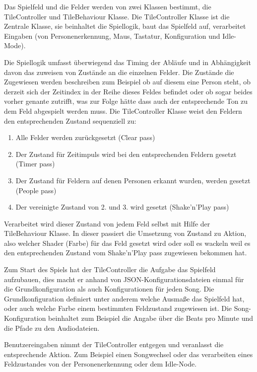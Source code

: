 
Das Spielfeld und die Felder werden von zwei Klassen bestimmt, die TileController und TileBehaviour Klasse. 
Die TileController Klasse ist die Zentrale Klasse, sie beinhaltet die Spiellogik, baut das Spielfeld auf, verarbeitet Eingaben (von Personenerkennung, Maus, Tastatur, Konfiguration und Idle-Mode).

Die Spiellogik umfasst überwiegend das Timing der Abläufe und in Abhängigkeit davon das zuweisen von Zustände an die einzelnen Felder. Die Zustände die Zugewiesen werden beschreiben zum Beispiel ob auf diesem eine Person steht, ob derzeit sich der Zeitindex in der Reihe dieses Feldes befindet oder ob sogar beides vorher genante zutrifft, was zur Folge hätte dass auch der entsprechende Ton zu dem Feld abgespielt werden muss. Die TileController Klasse weist den Feldern den entsprechenden Zustand sequenziell zu:
\begin{enumerate}
\item Alle Felder werden zurückgesetzt (Clear pass)
\item Der Zustand für Zeitimpuls wird bei den entsprechenden Feldern gesetzt (Timer pass)
\item Der Zustand für Feldern auf denen Personen erkannt wurden, werden gesetzt (People pass)
\item Der vereinigte Zustand von 2. und 3. wird gesetzt (Shake'n'Play pass)
\end{enumerate}
Verarbeitet wird dieser Zustand von jedem Feld selbst mit Hilfe der TileBehaviour Klasse. In dieser passiert die Umsetzung von Zustand zu Aktion, also welcher Shader (Farbe) für das Feld gesetzt wird oder soll es wackeln weil es den entsprechenden Zustand vom Shake'n'Play pass zugewiesen bekommen hat.

Zum Start des Spiels hat der TileController die Aufgabe das Spielfeld aufzubauen, dies macht er anhand von JSON-Konfigurationsdateien einmal für die Grundkonfiguration als auch Konfigurationen für jeden Song. Die Grundkonfiguration definiert unter anderem welche Ausmaße das Spielfeld hat, oder auch welche Farbe einem bestimmten Feldzustand zugewiesen ist. Die Song-Konfiguration beinhaltet zum Beispiel die Angabe über die Beats pro Minute und die Pfade zu den Audiodateien.

Benutzereingaben nimmt der TileController entgegen und veranlasst die entsprechende Aktion. Zum Beispiel einen Songwechsel oder das verarbeiten eines Feldzustandes von der Personenerkennung oder dem Idle-Node.


